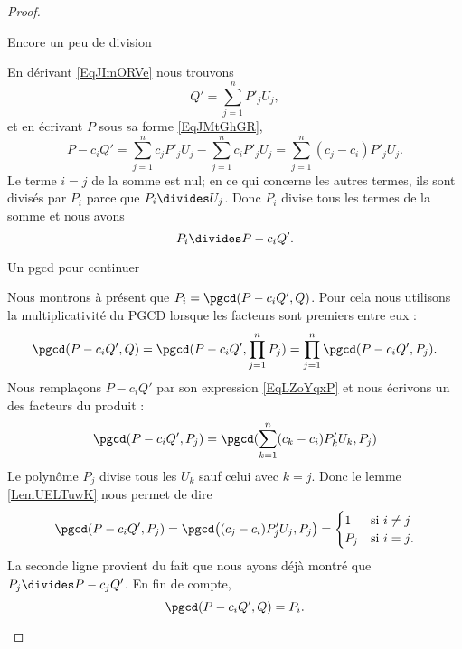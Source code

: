 \begin{proof}
\begin{subproof}
\item[Encore un peu de division]

    En dérivant \eqref{EqJImORVe} nous trouvons
    \begin{equation}
        Q'=\sum_{j=1}^nP'_jU_j,
    \end{equation}
    et en écrivant \( P\) sous sa forme \eqref{EqJMtGhGR},
    \begin{equation}    \label{EqLZoYqxP}
        P-c_iQ'=\sum_{j=1}^nc_jP'_jU_j-\sum_{j=1}^nc_iP'_jU_j=\sum_{j=1}^n(c_j-c_i)P'_jU_j.
    \end{equation}
    Le terme \( i=j\) de la somme est nul; en ce qui concerne les autres termes, ils sont divisés par \( P_i\) parce que \( P_i\divides U_j\). Donc \( P_i\) divise tous les termes de la somme et nous avons
    \begin{equation}
        P_i\divides P-c_iQ'.
    \end{equation}
    
\item[Un pgcd pour continuer]

    Nous montrons à présent que \( P_i=\pgcd(P-c_iQ',Q)\). Pour cela nous utilisons la multiplicativité du PGCD lorsque les facteurs sont premiers entre eux :
    \begin{equation}
        \pgcd(P-c_iQ',Q)=\pgcd(P-c_iQ',\prod_{j=1}^nP_j)=\prod_{j=1}^n\pgcd(P-c_iQ',P_j).
    \end{equation}
    Nous remplaçons \( P-c_iQ'\) par son expression \eqref{EqLZoYqxP} et nous écrivons un des facteurs du produit :
    \begin{equation}
        \pgcd(P-c_iQ',P_j)=\pgcd(\sum_{k=1}^n(c_k-c_i)P'_kU_k,P_j)
    \end{equation}
    Le polynôme \( P_j\) divise tous les \( U_k\) sauf celui avec \( k=j\). Donc le lemme \ref{LemUELTuwK} nous permet de dire
    \begin{equation}
        \pgcd(P-c_iQ',P_j)=\pgcd\big( (c_j-c_i)P'_jU_j,P_j \big)=\begin{cases}
            1    &   \text{si \( i\neq j\)}\\
            P_j    &    \text{si \( i=j\).}
        \end{cases}
    \end{equation}
    La seconde ligne provient du fait que nous ayons déjà montré que \( P_j\divides P-c_jQ'\). En fin de compte,
    \begin{equation}
        \pgcd(P-c_iQ',Q)=P_i.
    \end{equation}
    

\end{subproof}
\end{proof}
